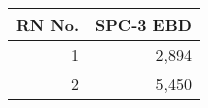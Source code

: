 \begin{tabular}{rr}
\toprule
 RN No. & SPC-3 EBD \\
\midrule
      1 &     2,894 \\
      2 &     5,450 \\
\bottomrule
\end{tabular}
